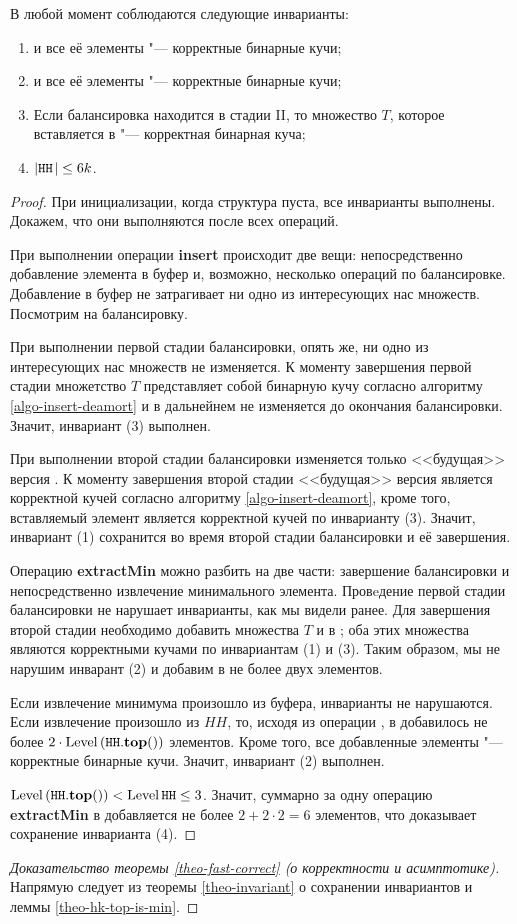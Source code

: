 \begin{theorem} \label{theo-invariant}
В любой момент соблюдаются следующие инварианты:
\begin{enumerate}
\item \MH и все её элементы "--- корректные бинарные кучи;
\item \HH и все её элементы "--- корректные бинарные кучи;
\item Если балансировка находится в стадии II, то множество $T$, которое
вставляется в \MH "--- корректная бинарная куча;
\item $|\texttt{HH}\;\!| \leq 6k$.
\end{enumerate}
\end{theorem}
\begin{proof}
При инициализации, когда структура пуста, все инварианты выполнены. Докажем,
что они выполняются после всех операций.

При выполнении операции \textbf{insert} происходит две вещи: непосредственно добавление
элемента в буфер и, возможно, несколько операций по балансировке. Добавление
в буфер не затрагивает ни одно из интересующих нас множеств. Посмотрим на балансировку.

При выполнении первой стадии балансировки, опять же, ни одно из интересующих
нас множеств не изменяется. К моменту завершения первой стадии множетство
$T$ представляет собой бинарную кучу согласно алгоритму \ref{algo-insert-deamort}
и в дальнейнем не изменяется до окончания балансировки. Значит, инвариант
(3) выполнен.

При выполнении второй стадии балансировки изменяется только <<будущая>>
версия \MH. К моменту завершения второй стадии <<будущая>> версия является
корректной кучей согласно алгоритму \ref{algo-insert-deamort}, кроме того,
вставляемый элемент является корректной кучей по инварианту (3). Значит,
инвариант (1) сохранится во время второй стадии балансировки и её завершения.

Операцию \textbf{extractMin} можно разбить на две части: завершение балансировки
и непосредственно извлечение минимального элемента. Провeдение первой стадии
балансировки не нарушает инварианты, как мы видели ранее. Для завершения
второй стадии необходимо добавить множества $T$ и \MH в \HH; оба этих множества
являются корректными кучами по инвариантам (1) и (3). Таким образом, мы не нарушим
инварант (2) и добавим в \HH не более двух элементов.

Если извлечение минимума произошло из буфера, инварианты не нарушаются. Если
извлечение произошло из $HH$, то, исходя из операции \Yield, в \HH
добавилось не более $2 \cdot \operatorname{Level} \left(\texttt{HH}.\mathbf{top}()\right)$ элементов. Кроме того,
все добавленные элементы "--- корректные бинарные кучи. Значит, инвариант (2)
выполнен.

$\operatorname{Level} \left(\texttt{HH}.\mathbf{top}()\right) < \operatorname{Level} \texttt{HH} \leq 3$. Значит, суммарно за одну операцию
\textbf{extractMin} в \HH добавляется не более $2 + 2\cdot 2 = 6$ элементов,
что доказывает сохранение инварианта (4).

\end{proof}

\begin{proof}[Доказательство теоремы \ref{theo-fast-correct} (о корректности и асимптотике)]
Напрямую следует из теоремы \ref{theo-invariant} о сохранении инвариантов и леммы
\ref{theo-hk-top-is-min}.
\end{proof}
